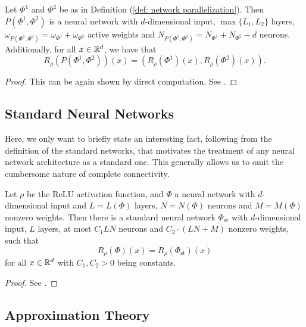 \begin{lemma} \label{lemma: network parallelization}
    Let $\Phi^1$ and $\Phi^2$ be as in Definition (\ref{def: network parallelization}). Then 
    $P(\Phi^1, \Phi^2)$ is a neural network with $d$-dimensional input, $\max\{L_1, L_2\}$ layers, 
    $\omega_{P(\Phi^1, \Phi^2)} = \omega_{\Phi^1} + \omega_{\Phi^2}$ active weights and $N_{P(\Phi^1, \Phi^2)} = N_{\Phi^1} + N_{\Phi^2} - d$ neurons.
    Additionally, for all $x \in \mathbb{R}^d$, we have that
    \begin{equation*}
        R_{\rho}(P(\Phi^1, \Phi^2))(x) = (R_{\rho}(\Phi^1)(x), R_{\rho}(\Phi^2)(x)).
    \end{equation*}
\end{lemma}
\begin{proof}
    This can be again shown by direct computation. See \cite{gühring2019nn}.
\end{proof}

\subsection{Standard Neural Networks}

Here, we only want to briefly state an interesting fact, following from the definition of the standard networks, that
motivates the treatment of any neural network architecture as a standard one. This generally allows us to omit the 
cumbersome nature of complete connectivity.

\begin{corollary} \label{cor: eqivalence nn and standard nn}
    Let $\rho$ be the ReLU activation function, and
    $\Phi$ a neural network with $d$-dimensional input and $L = L(\Phi)$ layers, $N = N(\Phi)$
    neurons and $M = M(\Phi)$ nonzero weights. Then there is a standard neural network $\Phi_{\text{st}}$ with
    $d$-dimensional input, $L$ layers, at most $C_1 L N$ neurons and $C_2 \cdot (L N + M)$ nonzero weights, such that
    \begin{equation*}
        R_\rho(\Phi)(x) = R_\rho(\Phi_{\text{st}})(x)
    \end{equation*}
    for all $x \in \mathbb{R}^d$ with $C_1, C_2 > 0$ being constants.
\end{corollary}
\begin{proof}
    See \cite[p.9]{gühring2019nn}.
\end{proof}

\subsection{Approximation Theory}

